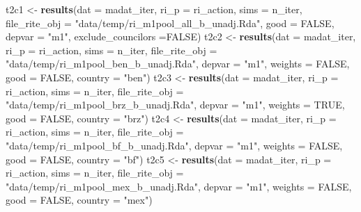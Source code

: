 \documentclass[]{article}
\newenvironment{Shaded}{\begin{snugshade}}{\end{snugshade}}
\newcommand{\KeywordTok}[1]{\textcolor[rgb]{0.13,0.29,0.53}{\textbf{{#1}}}}
\newcommand{\DataTypeTok}[1]{\textcolor[rgb]{0.13,0.29,0.53}{{#1}}}
\newcommand{\StringTok}[1]{\textcolor[rgb]{0.31,0.60,0.02}{{#1}}}
\newcommand{\OtherTok}[1]{\textcolor[rgb]{0.56,0.35,0.01}{{#1}}}
\newcommand{\NormalTok}[1]{{#1}}
\begin{document}
\begin{Shaded}
\begin{Highlighting}[]
   \NormalTok{t2c1 <-}\StringTok{  }\KeywordTok{results}\NormalTok{(}\DataTypeTok{dat =} \NormalTok{madat_iter, }\DataTypeTok{ri_p =} \NormalTok{ri_action, }\DataTypeTok{sims =} \NormalTok{n_iter,}
                  \DataTypeTok{file_rite_obj =} \StringTok{"data/temp/ri_m1pool_all_b_unadj.Rda"}\NormalTok{,}
                  \DataTypeTok{good =} \OtherTok{FALSE}\NormalTok{, }\DataTypeTok{depvar =} \StringTok{"m1"}\NormalTok{, }\DataTypeTok{exclude_councilors =}\OtherTok{FALSE}\NormalTok{)}
  \NormalTok{t2c2 <-}\StringTok{ }\KeywordTok{results}\NormalTok{(}\DataTypeTok{dat =} \NormalTok{madat_iter, }\DataTypeTok{ri_p =} \NormalTok{ri_action, }\DataTypeTok{sims =} \NormalTok{n_iter,}
                  \DataTypeTok{file_rite_obj =} \StringTok{"data/temp/ri_m1pool_ben_b_unadj.Rda"}\NormalTok{,}
                  \DataTypeTok{depvar =} \StringTok{"m1"}\NormalTok{, }\DataTypeTok{weights =} \OtherTok{FALSE}\NormalTok{, }\DataTypeTok{good =} \OtherTok{FALSE}\NormalTok{, }\DataTypeTok{country =} \StringTok{"ben"}\NormalTok{)}
  \NormalTok{t2c3 <-}\StringTok{ }\KeywordTok{results}\NormalTok{(}\DataTypeTok{dat =} \NormalTok{madat_iter, }\DataTypeTok{ri_p =} \NormalTok{ri_action, }\DataTypeTok{sims =} \NormalTok{n_iter,}
                  \DataTypeTok{file_rite_obj =} \StringTok{"data/temp/ri_m1pool_brz_b_unadj.Rda"}\NormalTok{,}
                  \DataTypeTok{depvar =} \StringTok{"m1"}\NormalTok{, }\DataTypeTok{weights =} \OtherTok{TRUE}\NormalTok{,  }\DataTypeTok{good =} \OtherTok{FALSE}\NormalTok{, }\DataTypeTok{country =} \StringTok{"brz"}\NormalTok{)}
  \NormalTok{t2c4 <-}\StringTok{ }\KeywordTok{results}\NormalTok{(}\DataTypeTok{dat =} \NormalTok{madat_iter, }\DataTypeTok{ri_p =} \NormalTok{ri_action, }\DataTypeTok{sims =} \NormalTok{n_iter,}
                  \DataTypeTok{file_rite_obj =} \StringTok{"data/temp/ri_m1pool_bf_b_unadj.Rda"}\NormalTok{,}
                  \DataTypeTok{depvar =} \StringTok{"m1"}\NormalTok{, }\DataTypeTok{weights =} \OtherTok{FALSE}\NormalTok{, }\DataTypeTok{good =} \OtherTok{FALSE}\NormalTok{, }\DataTypeTok{country =} \StringTok{"bf"}\NormalTok{)}
  \NormalTok{t2c5 <-}\StringTok{ }\KeywordTok{results}\NormalTok{(}\DataTypeTok{dat =} \NormalTok{madat_iter, }\DataTypeTok{ri_p =} \NormalTok{ri_action, }\DataTypeTok{sims =} \NormalTok{n_iter,}
                  \DataTypeTok{file_rite_obj =} \StringTok{"data/temp/ri_m1pool_mex_b_unadj.Rda"}\NormalTok{,}
                  \DataTypeTok{depvar =} \StringTok{"m1"}\NormalTok{, }\DataTypeTok{weights =} \OtherTok{FALSE}\NormalTok{, }\DataTypeTok{good =} \OtherTok{FALSE}\NormalTok{, }\DataTypeTok{country =} \StringTok{"mex"}\NormalTok{)}

\end{Highlighting}
\end{Shaded}
\end{document}
